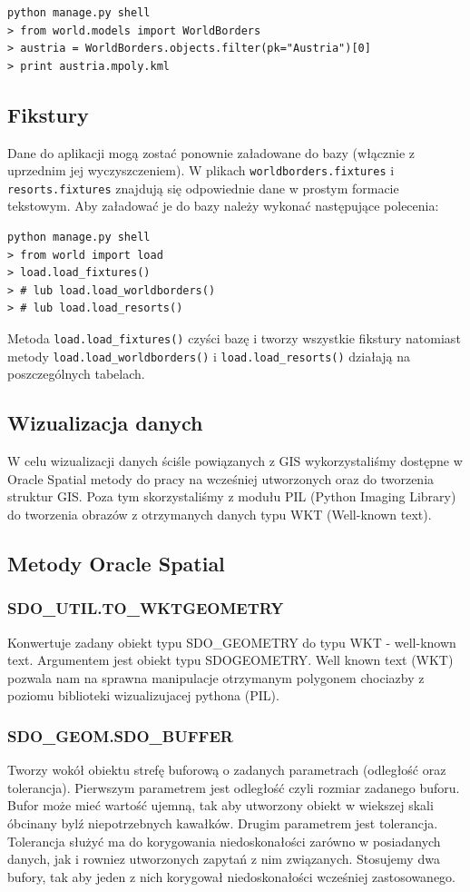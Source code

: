 \documentclass[12pt]{article}
\begin{document}
\begin{verbatim}
python manage.py shell
> from world.models import WorldBorders
> austria = WorldBorders.objects.filter(pk="Austria")[0]
> print austria.mpoly.kml
\end{verbatim}

\subsection{Fikstury}
Dane do aplikacji mogą zostać ponownie załadowane do bazy (włącznie z uprzednim jej wyczyszczeniem). W plikach
\texttt{worldborders.fixtures} i \texttt{resorts.fixtures} znajdują się odpowiednie dane w prostym formacie tekstowym.
Aby załadować je do bazy należy wykonać następujące polecenia:
\begin{verbatim}
python manage.py shell
> from world import load
> load.load_fixtures()
> # lub load.load_worldborders()
> # lub load.load_resorts()
\end{verbatim}
Metoda \texttt{load.load\_fixtures()} czyści bazę i tworzy wszystkie fikstury natomiast metody \texttt{load.load\_worldborders()}
i \texttt{load.load\_resorts()} działają na poszczególnych tabelach.

\subsection{Wizualizacja danych}
W celu wizualizacji danych ściśle powiązanych z GIS wykorzystaliśmy dostępne w Oracle Spatial metody do pracy na wcześniej utworzonych oraz do tworzenia struktur GIS. Poza tym skorzystaliśmy z modułu PIL (Python Imaging Library) do tworzenia obrazów z otrzymanych danych typu WKT (Well-known text).

\subsection{Metody Oracle Spatial}

\subsubsection{SDO\_UTIL.TO\_WKTGEOMETRY}
Konwertuje zadany obiekt typu SDO\_GEOMETRY do typu WKT - well-known text. Argumentem jest obiekt typu SDOGEOMETRY. 
Well known text (WKT) pozwala nam na sprawna manipulacje otrzymanym polygonem chociazby z poziomu biblioteki wizualizujacej pythona (PIL).
\subsubsection{SDO\_GEOM.SDO\_BUFFER}
Tworzy wokół obiektu strefę buforową o zadanych parametrach (odległość oraz tolerancja). Pierwszym parametrem jest odległość czyli rozmiar zadanego buforu. Bufor może mieć wartość ujemną, tak aby utworzony obiekt w wiekszej skali \'obcinany byl\' z niepotrzebnych kawałków. Drugim parametrem jest tolerancja. Tolerancja służyć ma do korygowania niedoskonałości zarówno w posiadanych danych, jak i rowniez utworzonych zapytań z nim związanych. Stosujemy dwa bufory, tak aby jeden z nich korygował niedoskonałości wcześniej zastosowanego.
\end{document}
